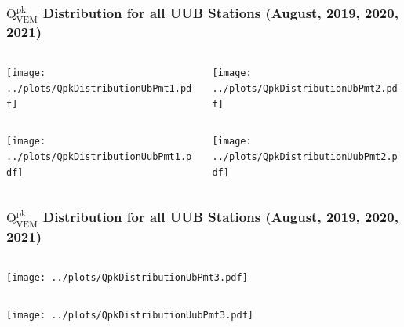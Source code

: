 \documentclass[aspectratio=169]{beamer}
\begin{document}
\begin{frame}
  \frametitle{$\mathrm{Q}^{\mathrm{pk}}_{\mathrm{VEM}}$
  Distribution for all UUB Stations (August, 2019, 2020, 2021)}
  \begin{center}
    \begin{columns}
      \begin{column}{.5\textwidth}
        \texttt{[image: ../plots/QpkDistributionUbPmt1.pdf]}
      \end{column}
      \begin{column}{.5\textwidth}
        \texttt{[image: ../plots/QpkDistributionUbPmt2.pdf]}
      \end{column}
    \end{columns}
    \begin{columns}
      \begin{column}{.5\textwidth}
        \texttt{[image: ../plots/QpkDistributionUubPmt1.pdf]}
      \end{column}
      \begin{column}{.5\textwidth}
        \texttt{[image: ../plots/QpkDistributionUubPmt2.pdf]}
      \end{column}
    \end{columns}
  \end{center}
\end{frame}

\begin{frame}
  \frametitle{$\mathrm{Q}^{\mathrm{pk}}_{\mathrm{VEM}}$
  Distribution for all UUB Stations (August, 2019, 2020, 2021)}
  \begin{center}
    \begin{columns}
      \begin{column}{.5\textwidth}
        \texttt{[image: ../plots/QpkDistributionUbPmt3.pdf]}
      \end{column}
      \begin{column}{.5\textwidth}
      \end{column}
    \end{columns}
    \begin{columns}
      \begin{column}{.5\textwidth}
        \texttt{[image: ../plots/QpkDistributionUubPmt3.pdf]}
      \end{column}
      \begin{column}{.5\textwidth}
      \end{column}
    \end{columns}
  \end{center}
\end{frame}
\end{document}
